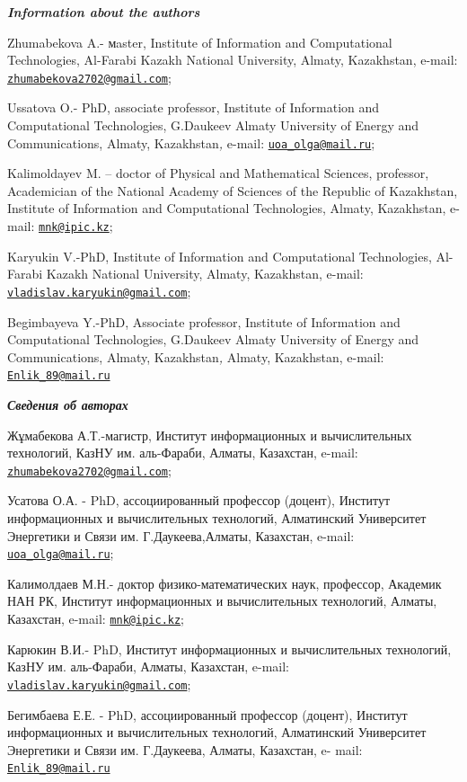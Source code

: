 \begin{authorinfo}
\hspace{1em}\emph{{\bfseries Information about the authors}}

Zhumabekova A.- мaster, Institute of Information and Computational
Technologies, Al-Farabi Kazakh National University, Almaty, Kazakhstan,
e-mail:
\href{mailto:zhumabekova2702@gmail.com}{\nolinkurl{zhumabekova2702@gmail.com}};

Ussatova O.- PhD, associate professor, Institute of Information and
Computational Technologies, G.Daukeev Almaty University of Energy and
Communications, Almaty, Kazakhstan\emph{,} e-mail:
\href{mailto:uoa_olga@mail.ru}{\nolinkurl{uoa\_olga@mail.ru}};

Kalimoldayev M. -- doctor of Physical and Mathematical Sciences,
professor, Academician of the National Academy of Sciences of the
Republic of Kazakhstan, Institute of Information and Computational
Technologies, Almaty, Kazakhstan, e-mail:
\href{mailto:mnk@ipic.kz}{\nolinkurl{mnk@ipic.kz}};

Karyukin V.-PhD, Institute of Information and Computational
Technologies, Al-Farabi Kazakh National University, Almaty, Kazakhstan,
e-mail:
\href{mailto:vladislav.karyukin@gmail.com}{\nolinkurl{vladislav.karyukin@gmail.com}};

Begimbayeva Y.-PhD, Associate professor, Institute of Information and
Computational Technologies, G.Daukeev Almaty University of Energy and
Communications, Almaty, Kazakhstan\emph{,} Almaty, Kazakhstan, e-mail:
\href{mailto:Enlik_89@mail.ru}{\nolinkurl{Enlik\_89@mail.ru}}

\hspace{1em}\emph{{\bfseries Сведения об авторах}}

Жұмабекова А.Т.-магистр, Институт информационных и вычислительных
технологий, КазНУ им. аль-Фараби, Алматы, Казахстан, e-mail:
\href{mailto:zhumabekova2702@gmail.com}{\nolinkurl{zhumabekova2702@gmail.com}};

Усатова О.А. - PhD, ассоциированный профессор (доцент), Институт
информационных и вычислительных технологий, Алматинский Университет
Энергетики и Связи им. Г.Даукеева,Алматы, Казахстан, e-mail:
\href{mailto:uoa_olga@mail.ru}{\nolinkurl{uoa\_olga@mail.ru}};

Калимолдаев М.Н.- доктор физико-математических наук, профессор, Академик
НАН РК, Институт информационных и вычислительных технологий, Алматы,
Казахстан, e-mail: \href{mailto:mnk@ipic.kz}{\nolinkurl{mnk@ipic.kz}};

Карюкин В.И.- PhD, Институт информационных и вычислительных технологий,
КазНУ им. аль-Фараби, Алматы, Казахстан, e-mail:
\href{mailto:vladislav.karyukin@gmail.com}{\nolinkurl{vladislav.karyukin@gmail.com}};

Бегимбаева Е.Е. - PhD, ассоциированный профессор (доцент), Институт
информационных и вычислительных технологий, Алматинский Университет
Энергетики и Связи им. Г.Даукеева, Алматы, Казахстан, e- mail:
\href{mailto:Enlik_89@mail.ru}{\nolinkurl{Enlik\_89@mail.ru}}
\end{authorinfo}
